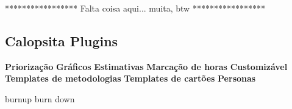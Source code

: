 *****************
Falta coisa aqui... muita, btw
*****************

 

\subsection{Calopsita Plugins}

\textbf{Priorização}
\textbf{Gráficos}
\textbf{Estimativas}
\textbf{Marcação de horas}
\textbf{Customizável}
\textbf{Templates de metodologias}
\textbf{Templates de cartões}
\textbf{Personas}


burnup
burn down


